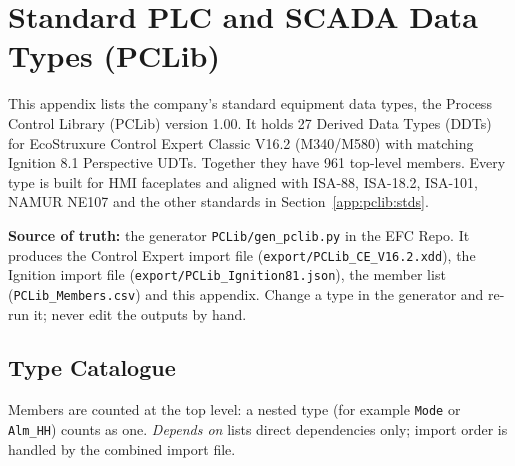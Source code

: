 %     

\chapter{Standard PLC and SCADA Data Types (PCLib) \newmark}
\label{app:pclib}

This appendix lists the company's standard equipment data types, the Process Control Library (PCLib) version 1.00. It holds 27 Derived Data Types (DDTs) for EcoStruxure Control Expert Classic V16.2 (M340/M580) with matching Ignition 8.1 Perspective UDTs. Together they have 961 top-level members. Every type is built for HMI faceplates and aligned with ISA-88, ISA-18.2, ISA-101, NAMUR NE107 and the other standards in Section~\ref{app:pclib:stds}.

\textbf{Source of truth:} the generator \texttt{PCLib/gen\_pclib.py} in the EFC Repo. It produces the Control Expert import file (\texttt{export/\allowbreak PCLib\_\allowbreak CE\_\allowbreak V16.2.xdd}), the Ignition import file (\texttt{export/\allowbreak PCLib\_\allowbreak Ignition81.json}), the member list (\texttt{PCLib\_Members.csv}) and this appendix. Change a type in the generator and re-run it; never edit the outputs by hand.



\section{Type Catalogue}
\label{app:pclib:catalogue}
Members are counted at the top level: a nested type (for example \texttt{Mode} or \texttt{Alm\_HH}) counts as one. \textit{Depends on} lists direct dependencies only; import order is handled by the combined import file.
